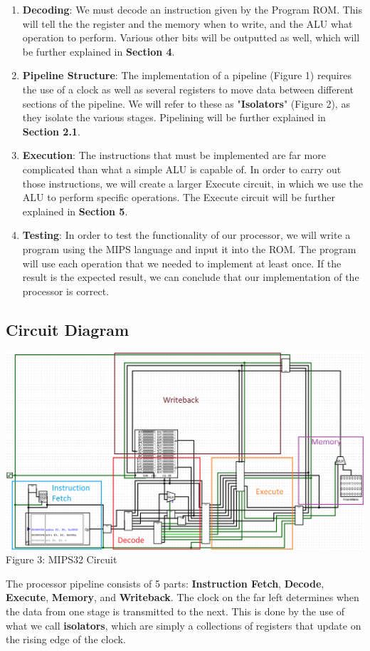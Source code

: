 \documentclass{article}
\begin{document}
\begin{enumerate}
\item
\textbf{Decoding}: We must decode an instruction given by the Program ROM. This will tell the the register and the memory when to write, and the ALU what operation to perform. Various other bits will be outputted as well, which will be further explained in \textbf{Section 4}.

\item
\textbf{Pipeline Structure}: The implementation of a pipeline (Figure 1) requires the use of a clock as well as several registers to move data between different sections of the pipeline. We will refer to these as "\textbf{Isolators}" (Figure 2), as they isolate the various stages. Pipelining will be further explained in \textbf{Section 2.1}.

\item
\textbf{Execution}: The instructions that must be implemented are far more complicated than what a simple ALU is capable of. In order to carry out those instructions, we will create a larger Execute circuit, in which we use the ALU to perform specific operations. The Execute circuit will be further explained in \textbf{Section 5}.

\item
\textbf{Testing}: In order to test the functionality of our processor, we will write a program using the MIPS language and input it into the ROM. The program will use each operation that we needed to implement at least once. If the result is the expected result, we can conclude that our implementation of the processor is correct.
\end{enumerate}

\subsection{Circuit Diagram}
\begin{center}
\includegraphics[scale=0.6]{Overview.png}
Figure 3: MIPS32 Circuit
\end{center}
The processor pipeline consists of 5 parts: \textbf{Instruction Fetch}, \textbf{Decode}, \textbf{Execute}, \textbf{Memory}, and \textbf{Writeback}. The clock on the far left determines when the data from one stage is transmitted to the next. This is done by the use of what we call \textbf{isolators}, which are simply a collections of registers that update on the rising edge of the clock. 
\end{document}
